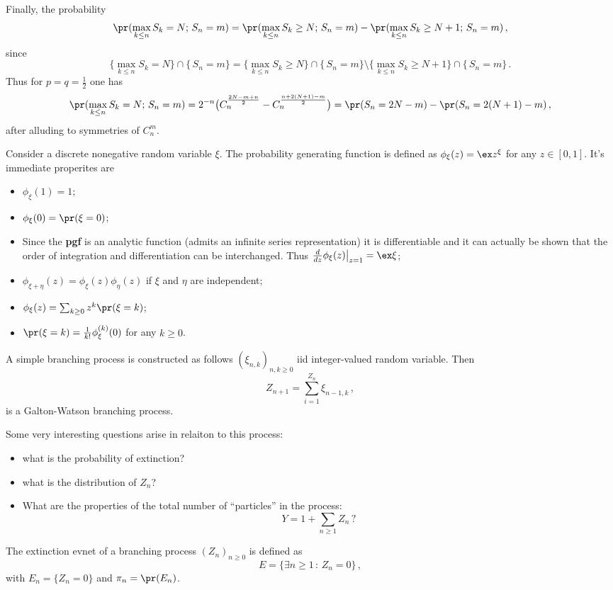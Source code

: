 Finally, the probability
\[ \pr(\max_{k\leq n} S_k = N;\,S_n = m )
	= \pr(\max_{k\leq n} S_k \geq N;\,S_n = m )
	- \pr(\max_{k\leq n} S_k \geq N + 1;\,S_n = m )\,, \]
since
\[ \{ \max_{k\leq n} S_k = N\} \cap \{\,S_n = m \}
	= \{ \max_{k\leq n} S_k \geq N\} \cap \{\,S_n = m \}
	\setminus \{ \max_{k\leq n} S_k \geq N + 1\} \cap \{\,S_n = m \} \,.\]
Thus for $p = q = \frac{1}{2}$ one has 
\[ \pr(\max_{k\leq n} S_k = N;\,S_n = m )
	= 2^{-n}\bigl( C_n^\frac{2N-m+n}{2}
		- C_n^\frac{n+2(N+1)-m}{2} \bigr)
	= \pr(S_n = 2N-m) - \pr(S_n = 2(N+1)-m)\,, \]
after alluding to symmetries of $C_n^m$.

Consider a discrete nonegative random variable $\xi$. The probability generating
function is defined as $\phi_\xi(z) = \ex z^\xi$ for any $z\in[0,1]$. It's immediate
properites are \begin{itemize}
	\item $\phi_\xi(1) = 1$;
	\item $\phi_\xi(0) = \pr(\xi=0)$;
	\item Since the \textbf{pgf} is an analytic function (admits an infinite series
	representation) it is differentiable and it can actually be shown that the order
	of integration and differentiation can be interchanged. Thus
	$\frac{d}{dz}\phi_\xi(z)\bigl.\bigr\rvert_{z=1} = \ex\xi$;
	\item $\phi_{\xi+\eta}(z) = \phi_\xi(z) \phi_\eta(z)$ if $\xi$ and $\eta$ are independent;
	\item $\phi_\xi(z) = \sum_{k\geq 0} z^k \pr(\xi=k)$;
	\item $\pr(\xi = k) = \frac{1}{k!}\phi_\xi^{(k)}(0)$ for any $k\geq 0$.
\end{itemize}

A simple branching process is constructed as follows $(\xi_{n,k})_{n,k\geq0}$ iid
integer-valued random variable. Then
\[ Z_{n+1} = \sum_{i=1}^{Z_n} \xi_{n-1,k} \,, \]
is a Galton-Watson branching process.

Some very interesting questions arise in relaiton to this process: \begin{itemize}
	\item what is the probability of extinction?
	\item what is the distribution of $Z_n$?
	\item What are the properties of the total number of ``particles'' in the process:
		\[ Y = 1 + \sum_{n \geq 1} Z_n \,? \]
\end{itemize}

The extinction evnet of a branching process $(Z_n)_{n\geq 0}$ is defined as 
\[ E = \{ \exists n\geq 1\,:\, Z_n = 0 \} \,, \]
with $ E_n = \{ Z_n = 0 \} $ and $\pi_n = \pr(E_n)$.

